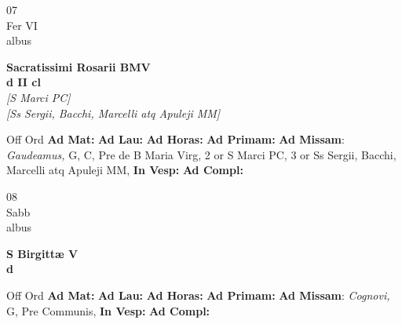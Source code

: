 \documentclass[10pt, openany]{book}
\begin{document}
        \begin{center}
            \begin{minipage}{3.5in}
                \vspace{2em}
                \begin{minipage}{0.5in}
                    {\Huge 07} \\
                    {\normalsize Fer VI} \\
                    {\normalsize albus}
                \end{minipage}
                \begin{minipage}{3.0in}
                    \textbf{ \large Sacratissimi Rosarii BMV \\
                    \textnormal{\normalsize d II cl}} \\ \textit{[S Marci PC]} \\ \textit{[Ss Sergii, Bacchi, Marcelli atq Apuleji MM]} \\ 
                \end{minipage}
                \begin{justify}Off Ord
                    \textbf{Ad Mat: }
                    \textbf{Ad Lau: }
                    \textbf{Ad Horas: }
                    \textbf{Ad Primam: }\textbf{Ad Missam}: \textit{Gaudeamus,} G, C, Pre de B Maria Virg, 2 or S Marci PC, 3 or Ss Sergii, Bacchi, Marcelli atq Apuleji MM,  
                    \textbf{In Vesp: }
                    \textbf{Ad Compl: }
                \end{justify}
            \end{minipage}
        \end{center}
    
        \begin{center}
            \begin{minipage}{3.5in}
                \vspace{2em}
                \begin{minipage}{0.5in}
                    {\Huge 08} \\
                    {\normalsize Sabb} \\
                    {\normalsize albus}
                \end{minipage}
                \begin{minipage}{3.0in}
                    \textbf{ \large S Birgittæ V \\
                    \textnormal{\normalsize d}} \\ 
                \end{minipage}
                \begin{justify}Off Ord
                    \textbf{Ad Mat: }
                    \textbf{Ad Lau: }
                    \textbf{Ad Horas: }
                    \textbf{Ad Primam: }\textbf{Ad Missam}: \textit{Cognovi,} G, Pre Communis,  
                    \textbf{In Vesp: }
                    \textbf{Ad Compl: }
                \end{justify}
            \end{minipage}
        \end{center}
    
\end{document}
